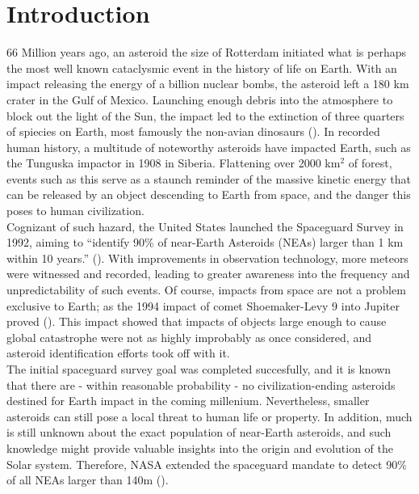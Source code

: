 \chapter{Introduction}
\label{ch:introduction}
66 Million years ago, an asteroid the size of Rotterdam initiated what is perhaps the most well known cataclysmic event in the history of life on Earth. With an impact releasing the energy of a billion nuclear bombs, the asteroid left a 180 km crater in the Gulf of Mexico. Launching enough debris into the atmosphere to block out the light of the Sun, the impact led to the extinction of three quarters of spiecies on Earth, most famously the non-avian dinosaurs (\cite{DinosaurAsteroid}). In recorded human history, a multitude of noteworthy asteroids have impacted Earth, such as the Tunguska impactor in 1908 in Siberia. Flattening over 2000 km$^2$ of forest, events such as this serve as a staunch reminder of the massive kinetic energy that can be released by an object descending to Earth from space, and the danger this poses to human civilization.\\

Cognizant of such hazard, the United States launched the Spaceguard Survey in 1992, aiming to ``identify 90\% of near-Earth Asteroids (NEAs) larger than 1 km within 10 years.'' (\cite{Spaceguard}). With improvements in observation technology, more meteors were witnessed and recorded, leading to greater awareness into the frequency and unpredictability of such events. Of course, impacts from space are not a problem exclusive to Earth; as the 1994 impact of comet Shoemaker-Levy 9 into Jupiter proved (\cite{LevyShoemaker}). This impact showed that impacts of objects large enough to cause global catastrophe were not as highly improbably as once considered, and asteroid identification efforts took off with it.\\

The initial spaceguard survey goal was completed succesfully, and it is known that there are - within reasonable probability - no civilization-ending asteroids destined for Earth impact in the coming millenium. Nevertheless, smaller asteroids can still pose a local threat to human life or property. In addition, much is still unknown about the exact population of near-Earth asteroids, and such knowledge might provide valuable insights into the origin and evolution of the Solar system. Therefore, NASA extended the spaceguard mandate to detect 90\% of all NEAs larger than 140m (\cite{SpaceguardHistory}). \\

